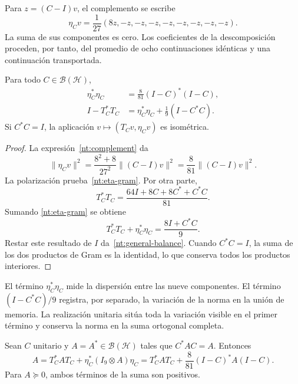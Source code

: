 Para \(z=(C-I)v\), el complemento se escribe
\begin{equation}
 \eta_Cv=\frac1{27}(8z,-z,-z,-z,-z,-z,-z,-z,-z).
 \label{nt:complement}
\end{equation}
La suma de sus componentes es cero. Los coeficientes de la
descomposición proceden, por tanto, del promedio de ocho
continuaciones idénticas y una continuación transportada.

\begin{proposition}
Para todo \(C\in\mathcal B(\mathcal H)\),
\begin{align}
 \eta_C^*\eta_C
   &=\frac8{81}(I-C)^*(I-C),\label{nt:eta-gram}\\
 I-T_C^*T_C
   &=\eta_C^*\eta_C+\frac19(I-C^*C).\label{nt:general-balance}
\end{align}
Si \(C^*C=I\), la aplicación
\(v\mapsto(T_Cv,\eta_Cv)\) es isométrica.
\end{proposition}

\begin{proof}
La expresión~\eqref{nt:complement} da
\[
 \|\eta_Cv\|^2
 =\frac{8^2+8}{27^2}\|(C-I)v\|^2
 =\frac8{81}\|(C-I)v\|^2.
\]
La polarización prueba~\eqref{nt:eta-gram}. Por otra parte,
\[
 T_C^*T_C
 =\frac{64I+8C+8C^*+C^*C}{81}.
\]
Sumando \eqref{nt:eta-gram} se obtiene
\[
 T_C^*T_C+\eta_C^*\eta_C=\frac{8I+C^*C}{9}.
\]
Restar este resultado de \(I\) da~\eqref{nt:general-balance}.
Cuando \(C^*C=I\), la suma de los dos productos de Gram es la
identidad, lo que conserva todos los productos interiores.
\end{proof}

El término \(\eta_C^*\eta_C\) mide la dispersión entre las nueve
componentes. El término \((I-C^*C)/9\) registra, por separado,
la variación de la norma en la unión de memoria. La realización
unitaria sitúa toda la variación visible en el primer término y
conserva la norma en la suma ortogonal completa.

\begin{proposition}
Sean \(C\) unitario y \(A=A^*\in\mathcal B(\mathcal H)\) tales que
\(C^*AC=A\). Entonces
\begin{equation}
 A=T_C^*AT_C+
   \eta_C^*(I_9\otimes A)\eta_C
  =T_C^*AT_C+\frac8{81}(I-C)^*A(I-C).
 \label{nt:observable-balance}
\end{equation}
Para \(A\succeq0\), ambos términos de la suma son positivos.
\end{proposition}

